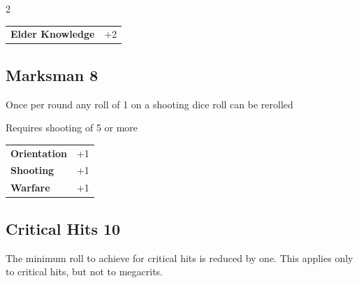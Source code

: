 \begin{multicols}{2}
\begin{tcolorbox}
\begin{tabular}{@{}ll@{}}
    \textbf{Elder Knowledge} & +2\\
\end{tabular}


\end{tcolorbox}

\begin{tcolorbox}
    \subsection*{Marksman \hfill \small{8 }}
    \tcblower
Once per round any roll of 1 on a shooting dice roll can be rerolled

Requires shooting of 5 or more


\vspace{3mm}

\begin{tabular}{@{}ll@{}}
    \textbf{Orientation} & +1\\
    \textbf{Shooting} & +1\\
    \textbf{Warfare} & +1\\
\end{tabular}


\end{tcolorbox}

\begin{tcolorbox}
    \subsection*{Critical Hits \hfill \small{10 }}
    \tcblower
The minimum roll to achieve for critical hits is reduced by one. This applies only to critical hits, but not to megacrits.


\vspace{3mm}



\end{tcolorbox}


\end{multicols}

